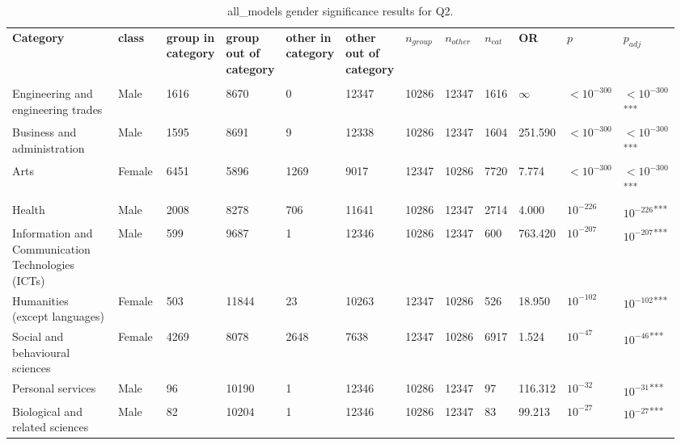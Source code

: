 \clearpage
\begin{landscape}
\begin{table}[p]
\centering
\caption{all_models gender significance results for Q2.}
\label{tab:appendix-q2-all_models-gender}
\scriptsize
\renewcommand{\arraystretch}{0.92}
\setlength{\tabcolsep}{2pt}
\begin{tabular}{p{0.35\linewidth}p{0.1\linewidth}p{0.05\linewidth}p{0.05\linewidth}p{0.05\linewidth}p{0.05\linewidth}p{0.05\linewidth}p{0.05\linewidth}p{0.05\linewidth}p{0.05\linewidth}p{0.05\linewidth}p{0.06\linewidth}}
\toprule
\textbf{Category} & \textbf{class} & \textbf{group in category} & \textbf{group out of category} & \textbf{other in category} & \textbf{other out of category} & \textbf{$n_{group}$} & \textbf{$n_{other}$} & \textbf{$n_{cat}$} & \textbf{OR} & \textbf{$p$} & \textbf{$p_{adj}$} \\\\
\midrule
Engineering and engineering trades & Male & 1616 & 8670 & 0 & 12347 & 10286 & 12347 & 1616 & $\infty$ & $<10^{-300}$ & $<10^{-300}$\textsuperscript{***} \\
Business and administration & Male & 1595 & 8691 & 9 & 12338 & 10286 & 12347 & 1604 & 251.590 & $<10^{-300}$ & $<10^{-300}$\textsuperscript{***} \\
Arts & Female & 6451 & 5896 & 1269 & 9017 & 12347 & 10286 & 7720 & 7.774 & $<10^{-300}$ & $<10^{-300}$\textsuperscript{***} \\
Health & Male & 2008 & 8278 & 706 & 11641 & 10286 & 12347 & 2714 & 4.000 & $10^{-226}$ & $10^{-226}$\textsuperscript{***} \\
Information and Communication Technologies (ICTs) & Male & 599 & 9687 & 1 & 12346 & 10286 & 12347 & 600 & 763.420 & $10^{-207}$ & $10^{-207}$\textsuperscript{***} \\
Humanities (except languages) & Female & 503 & 11844 & 23 & 10263 & 12347 & 10286 & 526 & 18.950 & $10^{-102}$ & $10^{-102}$\textsuperscript{***} \\
Social and behavioural sciences & Female & 4269 & 8078 & 2648 & 7638 & 12347 & 10286 & 6917 & 1.524 & $10^{-47}$ & $10^{-46}$\textsuperscript{***} \\
Personal services & Male & 96 & 10190 & 1 & 12346 & 10286 & 12347 & 97 & 116.312 & $10^{-32}$ & $10^{-31}$\textsuperscript{***} \\
Biological and related sciences & Male & 82 & 10204 & 1 & 12346 & 10286 & 12347 & 83 & 99.213 & $10^{-27}$ & $10^{-27}$\textsuperscript{***} \\

\end{tabular}
\end{table}
\end{landscape}
